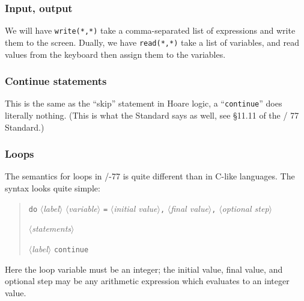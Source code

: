 \subsubsection{Input, output}
We will have \texttt{write(*,*)} take a comma-separated list of
expressions and write them to the screen. Dually, we have
\texttt{read(*,*)} take a list of variables, and read values from the
keyboard then assign them to the variables.

\subsubsection{Continue statements}
This is the same as the ``skip'' statement in Hoare logic, a
``\texttt{continue}'' does literally nothing. (This is what the Standard
says as well, see \S11.11 of the \FORTRAN/ 77 Standard.)

\subsubsection{Loops}
The semantics for loops in \FORTRAN/-77 is quite different than in
C-like languages. The syntax looks quite simple:
\begin{quotation}
\noindent\texttt{do} $\langle$\textit{label\/}$\rangle$
$\langle$\textit{variable\/}$\rangle$
\texttt{=} $\langle$\textit{initial value\/}$\rangle$\texttt{,}
$\langle$\textit{final value\/}$\rangle$\texttt{,}
$\langle$\textit{optional step\/}$\rangle$

$\langle$\textit{statements\/}$\rangle$

\noindent$\langle$\textit{label\/}$\rangle$ \texttt{continue}
\end{quotation}
Here the loop variable must be an integer; the initial value, final
value, and optional step may be any arithmetic expression which
evaluates to an integer value.

